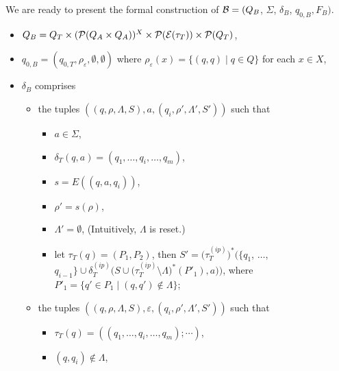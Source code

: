 We are ready to present the formal construction of $\mathcal{B} =  (Q_B$, $\Sigma$, $\delta_B$, $q_{0, B}, F_B)$. 
\begin{itemize}
\item $Q_B = Q_T \times (\mathcal{P}(Q_A \times Q_A ))^{X} \times \mathcal{P}(\mathcal{E}(\tau_T)) \times \mathcal{P}(Q_T)$, 

\item $q_{0, B} = (q_{0,T}, \rho_{\varepsilon}, \emptyset, \emptyset)$ where $\rho_{\varepsilon} (x) = \{(q, q) \mid q \in Q\}$ for each $x \in X$,

\item $\delta_{B}$ comprises 
\begin{itemize}
%
\item the tuples $((q, \rho, \Lambda, S), a, (q_i, \rho', \Lambda', S'))$ such that  
\begin{itemize}
\item $a \in \Sigma$, 
%
\item $\delta_T (q, a) = (q_1, \ldots, q_i, \ldots, q_m)$, 
%
\item $s = E((q, a, q_i))$, 
%
\item $\rho' = s(\rho)$,
%
\item $\Lambda' = \emptyset$, (Intuitively, $\Lambda$ is reset.)
%
\item let $\tau_T(q) = (P_1, P_2)$, then $S' = \big(\tau^{(ip)}_T\big)^\ast\big(\{ q_1$, $\ldots$, $q_{i - 1} \} \cup \delta^{(ip)}_T\big(S \cup \big(\tau^{(ip)}_T \setminus \Lambda\big)^\ast(P'_1), a\big)\big)$, where $P'_1 = \{q' \in P_1 \mid (q, q') \not \in \Lambda\}$;  
%
\end{itemize}
%
\item the tuples $((q, \rho, \Lambda, S), \varepsilon, (q_i, \rho', \Lambda', S'))$ such that 
\begin{itemize}
%
\item $\tau_T(q) = ((q_1, \ldots, q_i, \ldots, q_m); \cdots)$, 
%
\item $(q, q_i) \not \in \Lambda$,


\end{itemize}
\end{itemize}
\end{itemize}
